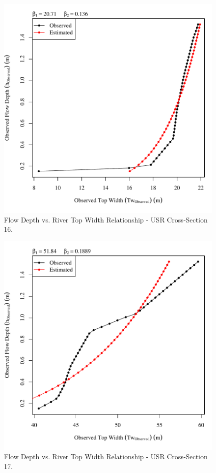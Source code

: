 \begin{center}
\begin{figure}[htbp]
	\includegraphics[width=6in]{"Figures/Results_USR/Survey Tw vs H-Section 16"}
	\caption{Flow Depth vs. River Top Width Relationship - USR Cross-Section 16.}
\end{figure}
\end{center}
\newpage

\begin{center}
\begin{figure}[htbp]
	\includegraphics[width=6in]{"Figures/Results_USR/Survey Tw vs H-Section 17"}
	\caption{Flow Depth vs. River Top Width Relationship - USR Cross-Section 17.}
\end{figure}
\end{center}
\newpage

